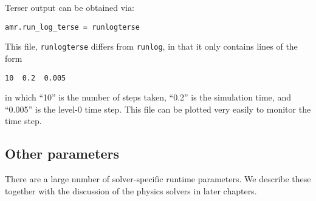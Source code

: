 Terser output can be obtained via:
\begin{lstlisting}
amr.run_log_terse = runlogterse
\end{lstlisting}
This file, {\tt runlogterse} differs from {\tt runlog}, in that it
only contains lines of the form
\begin{verbatim}
10  0.2  0.005
\end{verbatim}
in which ``10'' is the number of steps taken, ``0.2'' is the
simulation time, and ``0.005'' is the level-0 time step.  This file
can be plotted very easily to monitor the time step.



\subsection{Other parameters}

There are a large number of solver-specific runtime parameters.  We describe these
together with the discussion of the physics solvers in later chapters.
